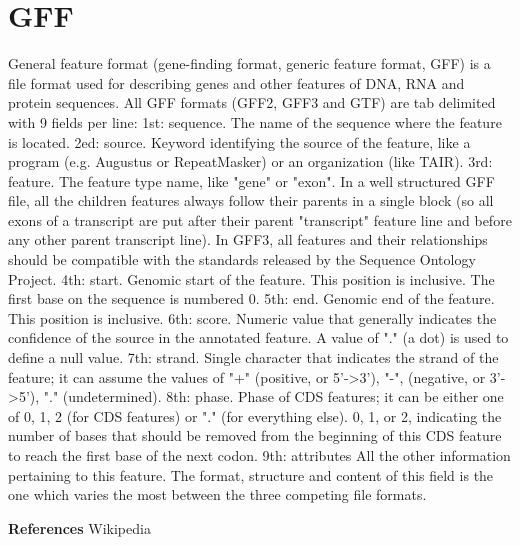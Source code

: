 \documentclass[11pt]{article}
\begin{document}
\section{GFF}
General feature format (gene-finding format, generic feature format, GFF) is a file format used for describing genes and other features of DNA, RNA and protein sequences. 
All GFF formats (GFF2, GFF3 and GTF) are tab delimited with 9 fields per line: 
\newline
1st: sequence. 
The name of the sequence where the feature is located.
\newline
2ed: source. 
Keyword identifying the source of the feature, like a program (e.g. Augustus or RepeatMasker) or an organization (like TAIR).
\newline
3rd: feature. 
The feature type name, like "gene" or "exon". 
In a well structured GFF file, all the children features always follow their parents in a single block (so all exons of a transcript are put after their parent "transcript" feature line and before any other parent transcript line). 
In GFF3, all features and their relationships should be compatible with the standards released by the Sequence Ontology Project.
\newline
4th: start. 
Genomic start of the feature. 
This position is inclusive. 
The first base on the sequence is numbered 0.
\newline
5th: end. 
Genomic end of the feature. 
This position is inclusive.
\newline
6th: score. 
Numeric value that generally indicates the confidence of the source in the annotated feature. 
A value of "." (a dot) is used to define a null value.
\newline
7th: strand. 
Single character that indicates the strand of the feature; 
it can assume the values of "+" (positive, or 5'->3'), "-", (negative, or 3'->5'), "." (undetermined).
\newline
8th: phase. 
Phase of CDS features; it can be either one of 0, 1, 2 (for CDS features) or "." (for everything else). 
0, 1, or 2, indicating the number of bases that should be removed from the beginning of this CDS feature to reach the first base of the next codon.
\newline
9th: attributes 
All the other information pertaining to this feature. 
The format, structure and content of this field is the one which varies the most between the three competing file formats.
 
\newpage
\textbf{References}
\newline
Wikipedia
\end{document}
